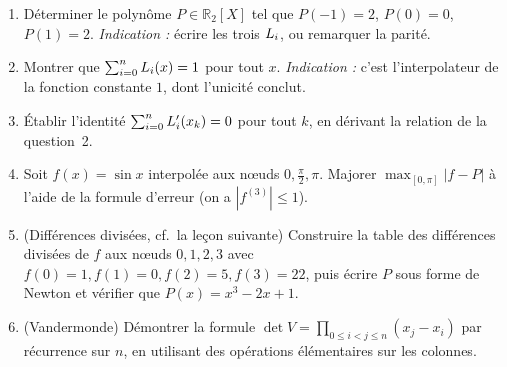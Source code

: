 \begin{mdframed}[style=exobar]
  \begin{enumerate}
    \item Déterminer le polynôme $P \in \mathbb{R}_2[X]$ tel que
          $P(-1)=2$, $P(0)=0$, $P(1)=2$. \textit{Indication :} écrire les
          trois $L_{i}$, ou remarquer la parité.

    \item Montrer que $\sum_{i=0}^{n} L_{i}(x) = 1$ pour tout $x$.
          \textit{Indication :} c'est l'interpolateur de la fonction
          constante $1$, dont l'unicité conclut.

    \item Établir l'identité $\sum_{i=0}^{n} L_{i}'(x_k) = 0$ pour tout
          $k$, en dérivant la relation de la question~2.

    \item Soit $f(x)=\sin x$ interpolée aux nœuds $0, \tfrac{\pi}{2}, \pi$.
          Majorer $\max_{[0,\pi]}|f-P|$ à l'aide de la formule d'erreur
          (on a $|f^{(3)}| \leq 1$).

    \item (Différences divisées, cf.\ la leçon suivante) Construire la
          table des différences divisées de $f$ aux nœuds $0,1,2,3$ avec
          $f(0)=1, f(1)=0, f(2)=5, f(3)=22$, puis écrire $P$ sous forme de
          Newton et vérifier que $P(x)=x^3-2x+1$.

    \item (Vandermonde) Démontrer la formule
          $\det V = \prod_{0\leq i<j\leq n}(x_j-x_i)$ par récurrence sur
          $n$, en utilisant des opérations élémentaires sur les colonnes.
  \end{enumerate}
\end{mdframed}


